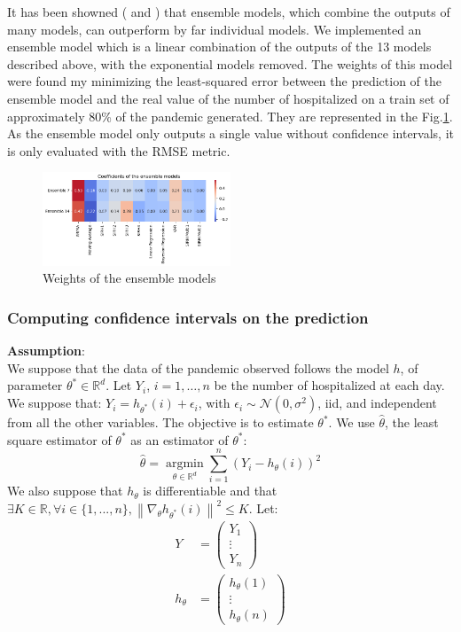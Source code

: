 It has been showned ( \cite{cramer2022evaluation} and \cite{reich2019accuracy} ) that ensemble models, which combine the outputs of many models, can outperform by far individual models.
We implemented an ensemble model which is a linear combination of the outputs of the 13 models described above, with the exponential models removed.
The weights of this model were found my minimizing the least-squared error between the prediction of the ensemble model and the real value of the number of hospitalized on a train set of approximately 80\% of the pandemic generated. 
They are represented in the Fig.\ref{fig:ensemble_weights}.
As the ensemble model only outputs a single value without confidence intervals, it is only evaluated with the RMSE metric. 
\begin{figure}
    \centering
    \includegraphics[width=0.5\textwidth]{figures/esb_coefs.png}
    \caption{Weights of the ensemble models}
    \label{fig:ensemble_weights}
\end{figure}
\subsubsection{Computing confidence intervals on the prediction}
\label{sec:ci}

\textbf{Assumption}:
\\[0.5cm]
We suppose that the data of the pandemic observed follows the model $h$, of parameter $\theta^* \in \mathbb{R}^d$. Let $Y_i$, $ i = 1, \ldots, n$ be the number of hospitalized at each day. We suppose that: $Y_i = h_{\theta ^* } (i) + \epsilon_i$, with $\epsilon_i \sim \mathcal{N}(0, \sigma^2)$, iid, and independent from all the other variables. The objective is to estimate $\theta^*$. We use $\hat{\theta}$, the least square estimator of $\theta^*$ as an estimator of $\theta^* $:
\[
\hat{\theta} =  \underset{\theta \in \mathbb{R}^d}{\operatorname{argmin}} \sum_{i=1}^{n} (Y_i - h_{\theta}(i))^2
\]
We also suppose that $h_\theta$ is differentiable and that  $ \exists K \in \mathbb{R},  \forall i \in \{1, ..., n\}, \left\lVert  \nabla_\theta h_{\theta^*}(i) \right\rVert^2 \leq  K$.
Let:
\begin{align*}
Y &= \begin{pmatrix}
Y_1 \\
\vdots \\
Y_n
\end{pmatrix} \\
h_\theta &= \begin{pmatrix}
h_\theta(1) \\
\vdots \\
h_\theta(n)
\end{pmatrix}
\end{align*}

